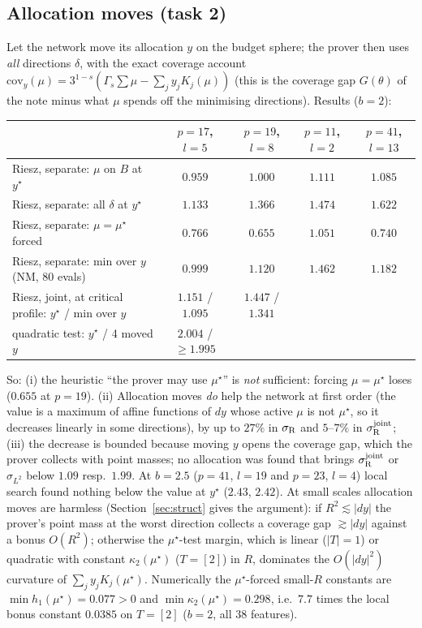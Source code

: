 \documentclass[11pt]{article}
\theoremstyle{definition}
\begin{document}
\subsection{Allocation moves (task 2)}\label{sec:alloc}
Let the network move its allocation $y$ on the budget sphere; the prover then uses \emph{all} directions $\delta$, with the exact coverage account
$\mathrm{cov}_y(\mu)=3^{1-s}(\Gamma_s\sum\mu-\sum_jy_jK_j(\mu))$ (this is the coverage gap $G(\theta)$ of the note minus what $\mu$ spends off the minimising
directions).  Results ($b=2$):
\begin{center}\small
\begin{tabular}{lcccc}
\toprule
 & $p=17$, $l=5$ & $p=19$, $l=8$ & $p=11$, $l=2$ & $p=41$, $l=13$\\
\midrule
Riesz, separate: $\mu$ on $B$ at $y^\star$ & $0.959$ & $1.000$ & $1.111$ & $1.085$\\
Riesz, separate: all $\delta$ at $y^\star$ & $1.133$ & $1.366$ & $1.474$ & $1.622$\\
Riesz, separate: $\mu=\mu^\star$ forced & $0.766$ & $0.655$ & $1.051$ & $0.740$\\
Riesz, separate: min over $y$ (NM, 80 evals) & $0.999$ & $1.120$ & $1.462$ & $1.182$\\
Riesz, joint, at critical profile: $y^\star$ / min over $y$ & $1.151$ / $1.095$ & $1.447$ / $1.341$ & & \\
quadratic test: $y^\star$ / 4 moved $y$ & $2.004$ / $\ge1.995$ & & & \\
\bottomrule
\end{tabular}
\end{center}
So: (i) the heuristic ``the prover may use $\mu^\star$'' is \emph{not} sufficient: forcing $\mu=\mu^\star$ loses ($0.655$ at $p=19$).  (ii) Allocation moves
\emph{do} help the network at first order (the value is a maximum of affine functions of $dy$ whose active $\mu$ is not $\mu^\star$, so it decreases linearly in
some directions), by up to $27\%$ in $\sigma_{\rm R}$ and $5$--$7\%$ in $\sigma^{\rm joint}_{\rm R}$; (iii) the decrease is bounded because moving $y$ opens the coverage gap,
which the prover collects with point masses; no allocation was found that brings $\sigma^{\rm joint}_{\rm R}$ or $\sigma_{L^2}$ below $1.09$ resp.\ $1.99$.  At $b=2.5$
($p=41$, $l=19$ and $p=23$, $l=4$) local search found nothing below the value at $y^\star$ ($2.43$, $2.42$).
At small scales allocation moves are harmless (Section~\ref{sec:struct} gives the argument): if $R^2\lesssim|dy|$ the prover's point mass at the worst direction
collects a coverage gap $\gtrsim|dy|$ against a bonus $O(R^2)$; otherwise the $\mu^\star$-test margin, which is linear ($|T|=1$) or quadratic with constant
$\kappa_2(\mu^\star)$ ($T=[2]$) in $R$, dominates the $O(|dy|^2)$ curvature of $\sum_jy_jK_j(\mu^\star)$.  Numerically the $\mu^\star$-forced small-$R$ constants are
$\min h_1(\mu^\star)=0.077>0$ and $\min\kappa_2(\mu^\star)=0.298$, i.e.\ $7.7$ times the local bonus constant $0.0385$ on $T=[2]$ ($b=2$, all $38$ features).
\end{document}
